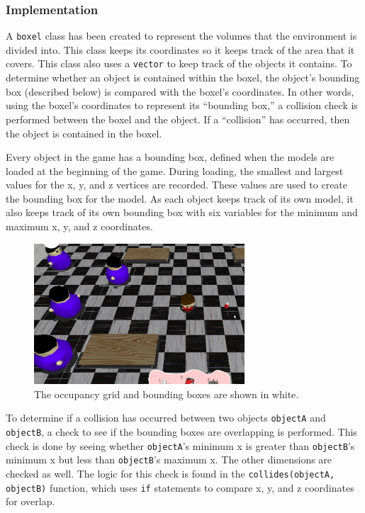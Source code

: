 \documentclass{article}
\begin{document}
\subsubsection{Implementation}
A \verb+boxel+ class has been created to represent the volumes that the environment is divided into. This class keeps its coordinates so it keeps track of the area that it covers. This class also uses a \verb+vector+ to keep track of the objects it contains. To determine whether an object is contained within the boxel, the object's bounding box (described below) is compared with the boxel's coordinates. In other words, using the boxel's coordinates to represent its ``bounding box,'' a collision check is performed between the boxel and the object. If a ``collision'' has occurred, then the object is contained in the boxel.

Every object in the game has a bounding box, defined when the models are loaded at the beginning of the game. During loading, the smallest and largest values for the x, y, and z vertices are recorded. These values are used to create the bounding box for the model. As each object keeps track of its own model, it also keeps track of its own bounding box with six variables for the minimum and maximum x, y, and z coordinates.

\begin{figure}[H]
  \centering
    \includegraphics[width=0.7\textwidth]{boxes}
    \caption{The occupancy grid and bounding boxes are shown in white.}
\end{figure}

To determine if a collision has occurred between two objects \verb+objectA+ and \verb+objectB+, a check to see if the bounding boxes are overlapping is performed. This check is done by seeing whether \verb+objectA+'s minimum x is greater than \verb+objectB+'s minimum x but less than \verb+objectB+'s maximum x. The other dimensions are checked as well. The logic for this check is found in the \verb+collides(objectA, objectB)+ function, which uses \verb+if+ statements to compare x, y, and z coordinates for overlap.
\end{document}
